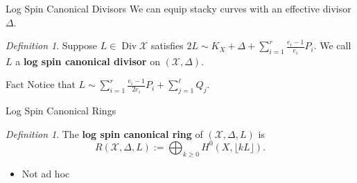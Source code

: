 \documentclass{beamer}
\theoremstyle{remark}
\newtheorem{defn}[thm]{Definition}
\newcommand\BQ{{\mathbb Q}}
\newcommand \sx{{\mathscr X}}
\DeclareMathOperator\di{Div}
\newcommand{\halfcan}{L}
\begin{document}

\begin{frame}{Log Spin Canonical Divisors}
We can equip stacky curves with an effective divisor $\Delta$.





\begin{defn}
Suppose $\halfcan \in \di
\sx$ satisfies $2 \halfcan \sim K_X + \Delta + \sum_{i = 1}^{r}
\frac{e_i - 1}{e_i} P_i$.  We call $\halfcan$ a
\textbf{log spin canonical divisor} on $(\sx, \Delta)$.
\end{defn}

\begin{block}{Fact}
Notice that $\halfcan \sim \sum_{i = 1}^{r} \frac{e_i - 1}{2e_i} P_i
+ \sum_{j = 1}^{\ell} Q_j$.
\end{block}

\end{frame}


\begin{frame}{Log Spin Canonical Rings}




\begin{defn}
The {\bf log spin canonical ring} of $(\sx, \Delta, \halfcan)$ is
\[
	R(\sx, \Delta, \halfcan) := \bigoplus_{k \geq 0} H^0(X, \lfloor k \halfcan \rfloor).
\]
\end{defn}

\begin{itemize}
\item Not ad hoc
\end{itemize}

\end{frame}
\end{document}
